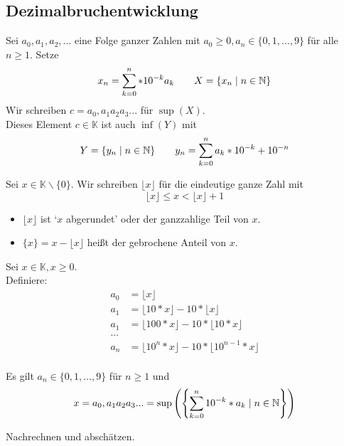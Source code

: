 \documentclass[main.tex]{subfiles}
\begin{document}
\subsection{Dezimalbruchentwicklung}

Sei $a_0,a_1,a_2,...$ eine Folge ganzer Zahlen mit $a_0 \geq 0 , a_n \in \{0,1,...,9\}$ für alle $n\geq 1$. Setze
$$x_n = \sum \limits_{k=0}^n * 10^{-k} a_k \qquad X = \{x_n \mid n\in \mathbb{N}\}$$
Wir schreiben $c = a_0 , a_1a_2a_3...$ für $\sup(X)$.\\
Dieses Element $c\in \mathbb{K}$ ist auch $\inf(Y)$ mit
$$Y = \{ y_n \mid n \in \mathbb{N} \} \qquad y_n = \sum \limits_{k=0}^{n} a_k * 10^{-k} + 10^{-n}$$

\begin{Definition}
  Sei $x\in \mathbb{K}\backslash \{0\}$. Wir schreiben $\lfloor x \rfloor$ für die eindeutige ganze Zahl mit
  $$\lfloor x \rfloor \leq x < \lfloor x \rfloor +1$$
  \begin{itemize}
    \item $\lfloor x \rfloor$ ist `$x$ abgerundet' oder der ganzzahlige Teil von $x$.
    \item $\{x\} = x - \lfloor x \rfloor$ heißt der gebrochene Anteil von $x$.
  \end{itemize}
\end{Definition}

\begin{Bemerkung}[Konstruktion]
  Sei $x \in \mathbb{K}, x \geq 0$.\\
  Definiere:
  $$\begin{aligned}
    a_0 &= \lfloor x \rfloor \\
    a_1 &=  \lfloor 10* x \rfloor - 10*\lfloor x \rfloor \\
    a_1 &=  \lfloor 100* x \rfloor - 10*\lfloor 10*x \rfloor \\
    ... & \\
    a_n &= \lfloor 10^n* x \rfloor - 10*\lfloor 10^{n-1}*x \rfloor \\
  \end{aligned}$$
\end{Bemerkung}

\begin{Theorem}
  Es gilt $a_n \in \{0,1,...,9\}$ für $n\geq 1$ und
  $$x = a_0 , a_1a_2a_3... = \sup\left(\left\{\sum \limits_{k=0}^n 10^{-k}* a_k \mid n \in \mathbb{N} \right\} \right)$$
\end{Theorem}

\begin{Beweis}
  Nachrechnen und abschätzen.
\end{Beweis}
\end{document}
